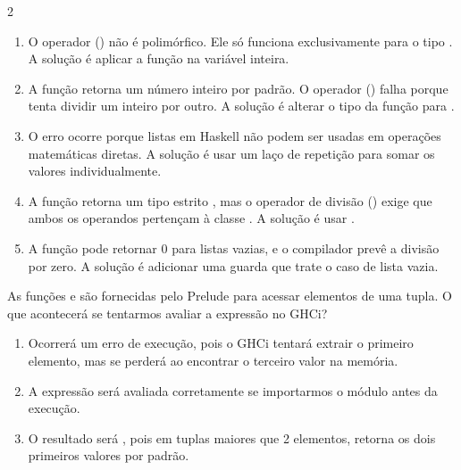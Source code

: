 \documentclass[a4paper,10pt,brazil]{article}
\begin{document}
\begin{multicols}{2}
\begin{enumerate}
  \item O operador (\haskellinline{/}) não é polimórfico. Ele só funciona exclusivamente para o tipo . A solução é aplicar a função  na variável  inteira.

  \item A função  retorna um número inteiro por padrão. O operador (\haskellinline{/}) falha porque tenta dividir um inteiro por outro. A solução é alterar o tipo da função para .

  \item O erro ocorre porque listas em Haskell não podem ser usadas em operações matemáticas diretas. A solução é usar um laço de repetição  para somar os valores individualmente.

  \item A função  retorna um tipo estrito , mas o operador de divisão (\haskellinline{/}) exige que ambos os operandos pertençam à classe . A solução é usar .

  \item A função  pode retornar 0 para listas vazias, e o compilador prevê a divisão por zero. A solução é adicionar uma guarda que trate o caso de lista vazia.


\end{enumerate}

As funções  e  são fornecidas pelo Prelude para acessar elementos de uma tupla. O que acontecerá se tentarmos avaliar a expressão  no GHCi?

\begin{enumerate}
  \item Ocorrerá um erro de execução, pois o GHCi tentará extrair o primeiro elemento, mas se perderá ao encontrar o terceiro valor na memória.

  \item A expressão será avaliada corretamente se importarmos o módulo  antes da execução.

  \item O resultado será , pois em tuplas maiores que 2 elementos,  retorna os dois primeiros valores por padrão.


\end{enumerate}
\end{multicols}
\end{document}
